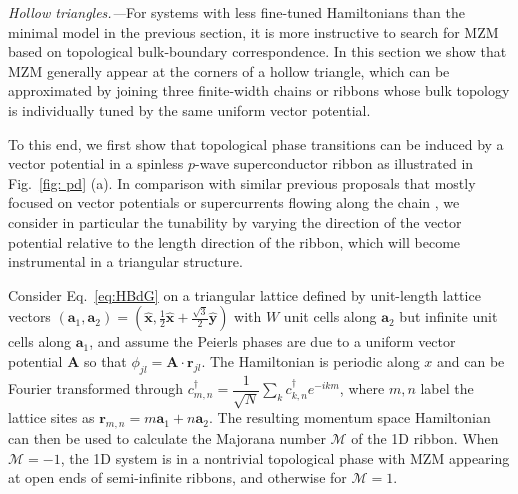 \documentclass[aps,prb,twocolumn,showpacs,amsmath,amssymb,superscriptaddress]{revtex4-2}
\let\oldhat\hat
\renewcommand{\hat}[1]{\oldhat{\mathbf{#1}}}
\newcommand{\cc}{c^{\dagger}}
\begin{document}
\emph{Hollow triangles.---}For systems with less fine-tuned Hamiltonians than the minimal model in the previous section, it is more instructive to search for MZM based on topological bulk-boundary correspondence. In this section we show that MZM generally appear at the corners of a hollow triangle, which can be approximated by joining three finite-width chains or ribbons whose bulk topology is individually tuned by the same uniform vector potential.

To this end, we first show that topological phase transitions can be induced by a vector potential in a spinless $p$-wave superconductor ribbon as illustrated in Fig.~\ref{fig: pd} (a). In comparison with similar previous proposals that mostly focused on vector potentials or supercurrents flowing along the chain \cite{romitoManipulatingMajoranaFermions2012, takasanSupercurrentinducedTopologicalPhase2022}, we consider in particular the tunability by varying the direction of the vector potential relative to the length direction of the ribbon, which will become instrumental in a triangular structure.

Consider Eq.~\eqref{eq:HBdG} on a triangular lattice defined by unit-length lattice vectors $(\mathbf a_1, \mathbf a_2) = (\hat{x}, \frac{1}{2}\hat{x} + \frac{\sqrt{3}}{2}\hat{y})$ with $W$ unit cells along $\mathbf a_2$ but infinite unit cells along $\mathbf a_1$, and assume the Peierls phases are due to a uniform vector potential $\mathbf A$ so that $\phi_{jl} = \mathbf A\cdot \mathbf r_{jl}$. The Hamiltonian is periodic along $x$ and can be Fourier transformed through $\cc_{m,n} = \dfrac{1}{\sqrt{N}} \sum_{k} \cc_{k,n} e^{-i km}$, where $m,n$ label the lattice sites as $\mathbf r_{m,n} = m\mathbf a_1 + n \mathbf a_2$. The resulting momentum space Hamiltonian \cite{supp} can then be used to calculate the Majorana number \cite{kitaevUnpairedMajoranaFermions2001,liTopologicalSuperconductivityInduced2014} $\mathcal{M}$ of the 1D ribbon. When $\mathcal{M} = -1$, the 1D system is in a nontrivial topological phase with MZM appearing at open ends of semi-infinite ribbons, and otherwise for $\mathcal{M} = 1$.
\end{document}
